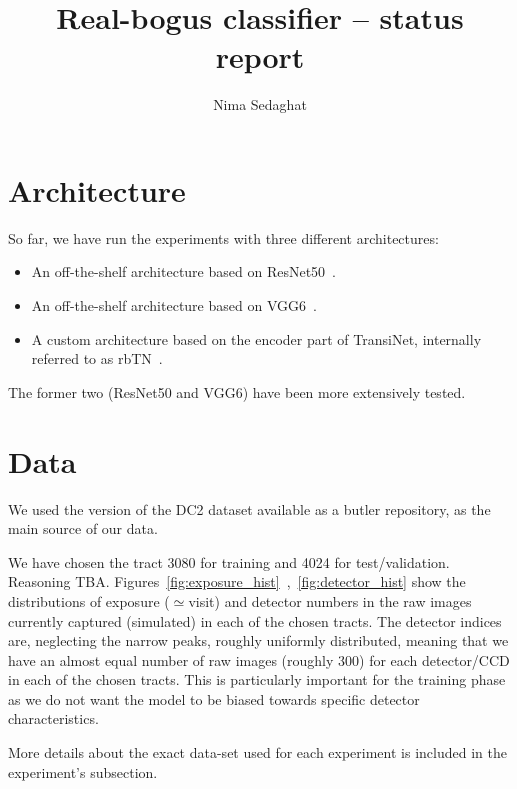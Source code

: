\documentclass[DM,authoryear,toc]{lsstdoc}
\title{Real-bogus classifier -- status report}
\author{%
Nima Sedaghat
}
\date{\vcsDate}
\begin{document}
\maketitle


\section{Architecture}
So far, we have run the experiments with three different architectures:

\begin{itemize}
\item{An off-the-shelf architecture based on ResNet50~\citep{he2016deep}.}
\item{An off-the-shelf architecture based on VGG6~\citep{simonyan2014very}.}
\item{A custom architecture based on the encoder part of TransiNet, internally referred to as rbTN~\citep{sedaghat2018effective}.}
\end{itemize}

The former two (ResNet50 and VGG6) have been more extensively tested.

\section{Data}
We used the version of the DC2 dataset available as a butler repository, as the main source of our data.

We have chosen the tract 3080 for training and 4024 for test/validation. Reasoning TBA.
Figures~\ref{fig:exposure_hist}~,~\ref{fig:detector_hist} show the distributions of exposure ($\simeq$visit) and detector numbers in the raw images currently captured (simulated) in each of the chosen tracts. The detector indices are, neglecting the narrow peaks, roughly uniformly distributed, meaning that we have an almost equal number of raw images (roughly 300) for each detector/CCD in each of the chosen tracts. This is particularly important for the training phase as we do not want the model to be biased towards specific detector characteristics.

More details about the exact data-set used for each experiment is included in the experiment's subsection.
\end{document}
